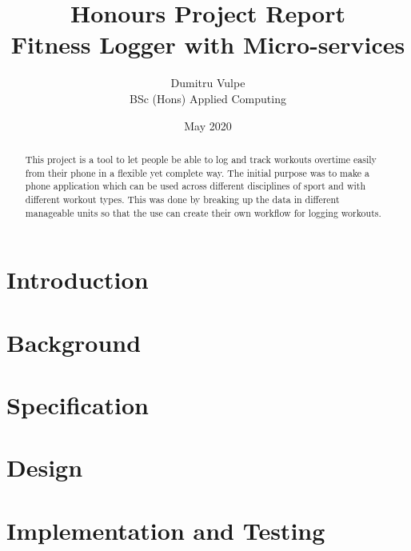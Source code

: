 \documentclass[twocolumn]{article}
\title{Honours Project Report\\Fitness Logger with Micro-services}
\author{Dumitru Vulpe\\BSc (Hons) Applied Computing}
\date{May 2020}
\begin{document}
\maketitle

\begin{abstract}

  This project is a tool to let people be able to log and track workouts overtime easily from their phone in a flexible yet complete way. The initial purpose was to make a phone application which can be used across different disciplines of sport and with different workout types. This was done by breaking up the data in different manageable units so that the use can create their own workflow for logging workouts.

\end{abstract}

\section{Introduction}
\vspace{-1ex}



\section{Background}
\vspace{-1ex}


\section{Specification}
\vspace{-1ex}


\section{Design}
\vspace{-1ex}

\section{Implementation and Testing}
\vspace{-1ex}
\end{document}
